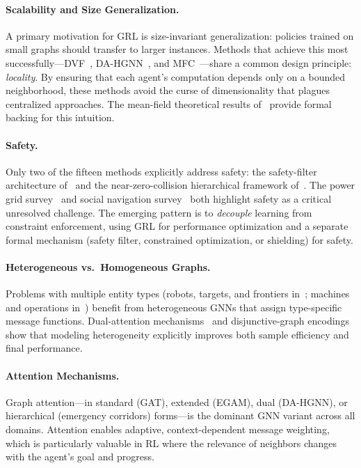 \documentclass{article}
\begin{document}
\paragraph{Scalability and Size Generalization.}
A primary motivation for GRL is size-invariant generalization: policies trained on small graphs should transfer to larger instances. Methods that achieve this most successfully---DVF~\cite{dvf2026}, DA-HGNN~\cite{dahgnn2026}, and MFC~\cite{mfc_sparse2026}---share a common design principle: \emph{locality}. By ensuring that each agent's computation depends only on a bounded neighborhood, these methods avoid the curse of dimensionality that plagues centralized approaches. The mean-field theoretical results of~\cite{mfc_sparse2026} provide formal backing for this intuition.

\paragraph{Safety.}
Only two of the fifteen methods explicitly address safety: the safety-filter architecture of~\cite{safe_explore2025} and the near-zero-collision hierarchical framework of~\cite{hier_gnn2026}. The power grid survey~\cite{grl_power2025} and social navigation survey~\cite{social_nav2025} both highlight safety as a critical unresolved challenge. The emerging pattern is to \emph{decouple} learning from constraint enforcement, using GRL for performance optimization and a separate formal mechanism (safety filter, constrained optimization, or shielding) for safety.

\paragraph{Heterogeneous vs.\ Homogeneous Graphs.}
Problems with multiple entity types (robots, targets, and frontiers in~\cite{dahgnn2026}; machines and operations in~\cite{gnn_jssp2024}) benefit from heterogeneous GNNs that assign type-specific message functions. Dual-attention mechanisms~\cite{dahgnn2026} and disjunctive-graph encodings~\cite{gnn_jssp2024} show that modeling heterogeneity explicitly improves both sample efficiency and final performance.

\paragraph{Attention Mechanisms.}
Graph attention---in standard (GAT), extended (EGAM), dual (DA-HGNN), or hierarchical (emergency corridors) forms---is the dominant GNN variant across all domains. Attention enables adaptive, context-dependent message weighting, which is particularly valuable in RL where the relevance of neighbors changes with the agent's goal and progress.
\end{document}
